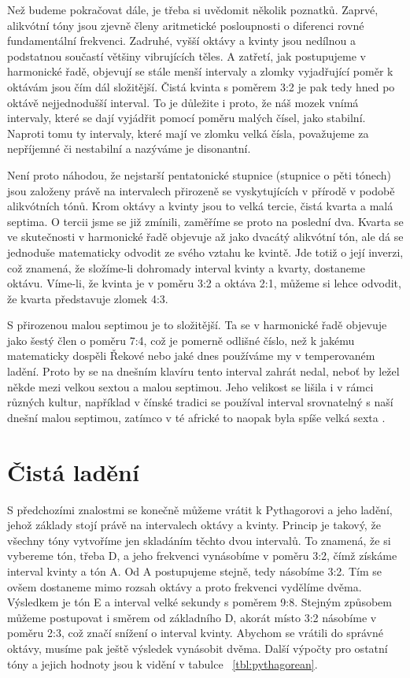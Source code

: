\documentclass[12pt]{article}
\begin{document}
Než budeme pokračovat dále, je třeba si uvědomit několik poznatků. Zaprvé, alikvótní tóny jsou zjevně členy aritmetické posloupnosti o diferenci rovné fundamentální frekvenci. Zadruhé, vyšší oktávy a kvinty jsou nedílnou a podstatnou součastí většiny vibrujících těles. A zatřetí, jak postupujeme v harmonické řadě, objevují se stále menší intervaly a zlomky vyjadřující poměr k oktávám jsou čím dál složitější. Čistá kvinta s poměrem 3:2 je pak tedy hned po oktávě nejjednodušší interval. To je důležite i proto, že náš mozek vnímá intervaly, které se dají vyjádřit pomocí poměru malých čísel, jako stabilní. Naproti tomu ty intervaly, které mají ve zlomku velká čísla, považujeme za nepříjemné či nestabilní a nazýváme je disonantní.

Není proto náhodou, že nejstarší pentatonické stupnice (stupnice o pěti tónech) jsou založeny právě na intervalech přirozeně se vyskytujících v přírodě v podobě alikvótních tónů. Krom oktávy a kvinty jsou to velká tercie, čistá kvarta a malá septima. O tercii jsme se již zmínili, zaměříme se proto na poslední dva. Kvarta se ve skutečnosti v harmonické řadě objevuje až jako dvacátý alikvótní tón, ale dá se jednoduše matematicky odvodit ze svého vztahu ke kvintě. Jde totiž o její inverzi, což znamená, že složíme-li dohromady interval kvinty a kvarty, dostaneme oktávu. Víme-li, že kvinta je v poměru 3:2 a oktáva 2:1, můžeme si lehce odvodit, že kvarta představuje zlomek 4:3.

S přirozenou malou septimou je to složitější. Ta se v harmonické řadě objevuje jako šestý člen o poměru 7:4, což je pomerně odlišné číslo, než k jakému matematicky dospěli Řekové nebo jaké dnes používáme my v temperovaném ladění. Proto by se na dnešním klavíru tento interval zahrát nedal, neboť by ležel někde mezi velkou sextou a malou septimou. Jeho velikost se lišila i v rámci různých kultur, například v čínské tradici se používal interval srovnatelný s naší dnešní malou septimou, zatímco v té africké to naopak byla spíše velká sexta \cite{bernstein}.

\section{Čistá ladění}

S předchozími znalostmi se konečně můžeme vrátit k Pythagorovi a jeho ladění, jehož základy stojí právě na intervalech oktávy a kvinty. Princip je takový, že všechny tóny vytvoříme jen skladáním těchto dvou intervalů. To znamená, že si vybereme tón, třeba D, a jeho frekvenci vynásobíme v poměru 3:2, čímž získáme interval kvinty a tón A. Od A postupujeme stejně, tedy násobíme 3:2. Tím se ovšem dostaneme mimo rozsah oktávy a proto frekvenci vydělíme dvěma. Výsledkem je tón E a interval velké sekundy s poměrem 9:8.
Stejným způsobem můžeme postupovat i směrem  od základního D, akorát místo 3:2 násobíme v poměru 2:3, což značí snížení o interval kvinty. Abychom se vrátili do správné oktávy, musíme pak ještě výsledek vynásobit dvěma. Další výpočty pro ostatní tóny a jejich hodnoty jsou k vidění v tabulce ~\ref{tbl:pythagorean}. 
\end{document}
